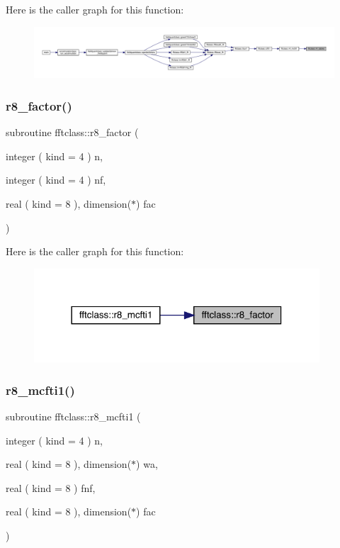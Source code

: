 Here is the caller graph for this function\+:\nopagebreak
\begin{figure}[H]
\begin{center}
\leavevmode
\includegraphics[width=350pt]{namespacefftclass_a882cd8d6eeb407d2b10ee9b3d9fee8b9_icgraph}
\end{center}
\end{figure}
\mbox{\label{namespacefftclass_a22bddf5efe99e8dcd5737d2d73ae832f}} 
\subsubsection{\texorpdfstring{r8\_factor()}{r8\_factor()}}
{\footnotesize\ttfamily subroutine fftclass\+::r8\+\_\+factor (\begin{DoxyParamCaption}\item[{integer ( kind = 4 )}]{n,  }\item[{integer ( kind = 4 )}]{nf,  }\item[{real ( kind = 8 ), dimension($\ast$)}]{fac }\end{DoxyParamCaption})}

Here is the caller graph for this function\+:\nopagebreak
\begin{figure}[H]
\begin{center}
\leavevmode
\includegraphics[width=302pt]{namespacefftclass_a22bddf5efe99e8dcd5737d2d73ae832f_icgraph}
\end{center}
\end{figure}
\mbox{\label{namespacefftclass_a89d64713ecbaec08b4d5180fcbc56cea}} 
\subsubsection{\texorpdfstring{r8\_mcfti1()}{r8\_mcfti1()}}
{\footnotesize\ttfamily subroutine fftclass\+::r8\+\_\+mcfti1 (\begin{DoxyParamCaption}\item[{integer ( kind = 4 )}]{n,  }\item[{real ( kind = 8 ), dimension($\ast$)}]{wa,  }\item[{real ( kind = 8 )}]{fnf,  }\item[{real ( kind = 8 ), dimension($\ast$)}]{fac }\end{DoxyParamCaption})}

